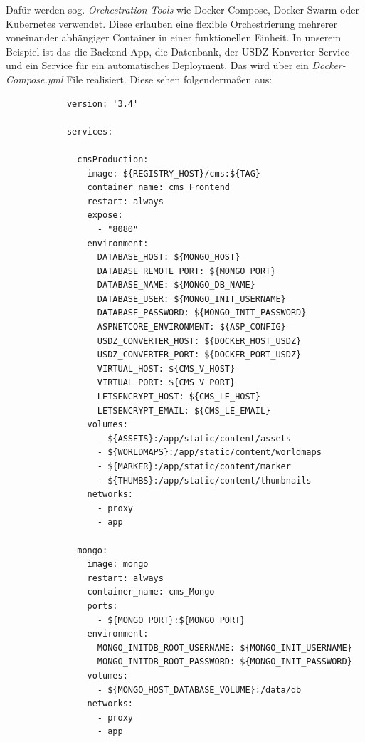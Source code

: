 \documentclass[titlepage, a4paper, 11pt]{scrartcl}
\begin{document}
          Dafür werden sog. \textit{Orchestration-Tools} wie Docker-Compose, Docker-Swarm oder Kubernetes verwendet. 
          Diese erlauben eine flexible Orchestrierung mehrerer voneinander abhängiger Container in einer funktionellen Einheit.
          In unserem Beispiel ist das die Backend-App, die Datenbank, der USDZ-Konverter Service und ein Service für ein automatisches Deployment.
          Das wird über ein \textit{Docker-Compose.yml} File realisiert. Diese sehen folgendermaßen aus:

          \begin{lstlisting}          
            version: '3.4'

            services:
            
              cmsProduction:
                image: ${REGISTRY_HOST}/cms:${TAG}
                container_name: cms_Frontend
                restart: always
                expose:
                  - "8080"
                environment:
                  DATABASE_HOST: ${MONGO_HOST}
                  DATABASE_REMOTE_PORT: ${MONGO_PORT}
                  DATABASE_NAME: ${MONGO_DB_NAME}
                  DATABASE_USER: ${MONGO_INIT_USERNAME}
                  DATABASE_PASSWORD: ${MONGO_INIT_PASSWORD}
                  ASPNETCORE_ENVIRONMENT: ${ASP_CONFIG}
                  USDZ_CONVERTER_HOST: ${DOCKER_HOST_USDZ}
                  USDZ_CONVERTER_PORT: ${DOCKER_PORT_USDZ}
                  VIRTUAL_HOST: ${CMS_V_HOST}
                  VIRTUAL_PORT: ${CMS_V_PORT}
                  LETSENCRYPT_HOST: ${CMS_LE_HOST}
                  LETSENCRYPT_EMAIL: ${CMS_LE_EMAIL}
                volumes:
                  - ${ASSETS}:/app/static/content/assets
                  - ${WORLDMAPS}:/app/static/content/worldmaps
                  - ${MARKER}:/app/static/content/marker
                  - ${THUMBS}:/app/static/content/thumbnails
                networks:
                  - proxy
                  - app
            
              mongo:
                image: mongo
                restart: always
                container_name: cms_Mongo
                ports:
                  - ${MONGO_PORT}:${MONGO_PORT}
                environment:
                  MONGO_INITDB_ROOT_USERNAME: ${MONGO_INIT_USERNAME}
                  MONGO_INITDB_ROOT_PASSWORD: ${MONGO_INIT_PASSWORD}
                volumes:
                  - ${MONGO_HOST_DATABASE_VOLUME}:/data/db
                networks:
                  - proxy
                  - app
                  

\end{lstlisting}
\end{document}
